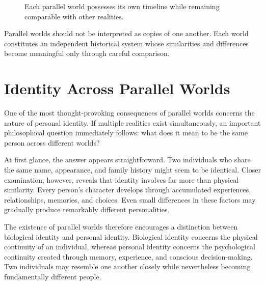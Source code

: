 \documentclass[12pt,oneside,openany]{book}
\begin{document}
\begin{figure}[H]
\centering
{}
\caption{Each parallel world possesses its own timeline while remaining comparable with other realities.}
\end{figure}

\begin{tcolorbox}[colback=blue!5,colframe=blue!60!black,title=Analysis]
Parallel worlds should not be interpreted as copies of one another. Each world
constitutes an independent historical system whose similarities and differences
become meaningful only through careful comparison.
\end{tcolorbox}
\section{Identity Across Parallel Worlds}

One of the most thought-provoking consequences of parallel worlds concerns the
nature of personal identity. If multiple realities exist simultaneously, an
important philosophical question immediately follows: what does it mean to be
the same person across different worlds?

At first glance, the answer appears straightforward. Two individuals who share
the same name, appearance, and family history might seem to be identical.
Closer examination, however, reveals that identity involves far more than
physical similarity. Every person's character develops through accumulated
experiences, relationships, memories, and choices. Even small differences in
these factors may gradually produce remarkably different personalities.

The existence of parallel worlds therefore encourages a distinction between
biological identity and personal identity. Biological identity concerns the
physical continuity of an individual, whereas personal identity concerns the
psychological continuity created through memory, experience, and conscious
decision-making. Two individuals may resemble one another closely while
nevertheless becoming fundamentally different people.
\end{document}

